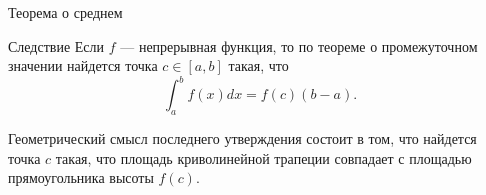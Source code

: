 \documentclass[8pt]{beamer}
\begin{document}
\begin{frame}{Теорема о среднем}
\begin{block}{Следствие}
Если $f$ --- непрерывная функция, то по теореме о промежуточном значении найдется точка $c\in[a,b]$ такая, что
$$\int_a^b f(x) dx = f(c)(b-a).$$
\end{block}
Геометрический смысл последнего утверждения состоит в том, что найдется точка $c$ такая, что площадь криволинейной трапеции совпадает с площадью прямоугольника высоты $f(c)$.
\begin{center}
\end{center}
\end{frame}
\end{document}
